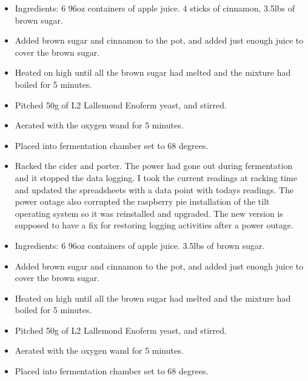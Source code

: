 \begin{itemize}
    \item Ingredients: 6 96oz containers of apple juice.  4 sticks of cinnamon, 3.5lbs of brown sugar.
    \item Added brown sugar and cinnamon to the pot, and added just enough juice to cover the brown sugar.
    \item Heated on high until all the brown sugar had melted and the mixture had boiled for 5 minutes.
    \item Pitched 50g of L2 Lallemond Enoferm yeast, and stirred.
    \item Aerated with the oxygen wand for 5 minutes.
    \item Placed into fermentation chamber set to 68 degrees.
\end{itemize}

\def\todaysdate{20200228}
\newday{\todaysdate}\label{\todaysdate}

\begin{itemize}
    \item Racked the cider and porter.  The power had gone out during fermentation and it stopped the data logging.  I took the current readings at racking time and updated the spreadsheets with a data point with todays readings.  The power outage also corrupted the raspberry pie installation of the tilt operating system so it was reinstalled and upgraded.  The new version is supposed to have a fix for restoring logging activities after a power outage.
\end{itemize}

\def\todaysdate{20200330}
\newday{\todaysdate}\label{\todaysdate}

\begin{itemize}
    \item Ingredients: 6 96oz containers of apple juice. 3.5lbs of brown sugar.
    \item Added brown sugar and cinnamon to the pot, and added just enough juice to cover the brown sugar.
    \item Heated on high until all the brown sugar had melted and the mixture had boiled for 5 minutes.
    \item Pitched 50g of L2 Lallemond Enoferm yeast, and stirred.
    \item Aerated with the oxygen wand for 5 minutes.
    \item Placed into fermentation chamber set to 68 degrees.
\end{itemize}
